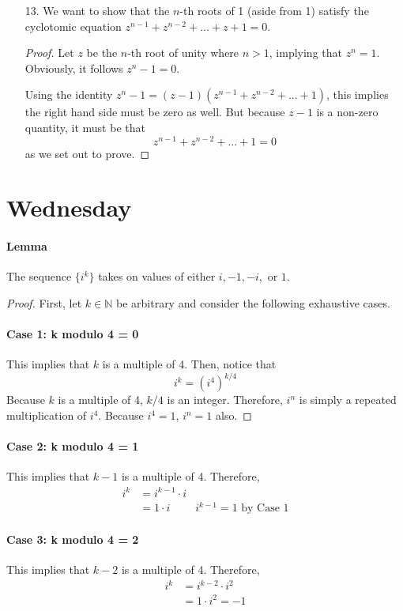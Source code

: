 \documentclass[11pt]{article}
\begin{document}
\begin{enumerate}
	\item[13.] We want to show that the $n$-th roots of 1 (aside from 1) satisfy the cyclotomic equation $z^{n-1} + z^{n-2} + ... + z + 1 = 0$. 
	
	\begin{proof}
		Let $z$ be the $n$-th root of unity where $n > 1$, implying that $z^n = 1$. Obviously, it follows $z^n - 1 = 0$. 
		
		\bigskip
		
		Using the identity $z^n - 1 = (z - 1)(z^{n - 1} + z^{n - 2} + ... + 1)$, this implies the right hand side must be zero as well. But because $z - 1$ is a non-zero quantity, it must be that 
		\[z^{n - 1} + z^{n - 2} + ... + 1 = 0\]
		as we set out to prove.
	\end{proof}
\end{enumerate}

\section*{Wednesday}
\paragraph{Lemma} The sequence $\{i^k\}$ takes on values of either $i, -1, -i, $ or $1$.

\begin{proof}
First, let $k \in \mathbb{N}$ be arbitrary and consider the following exhaustive cases.

\paragraph{Case 1: k modulo 4 = 0} This implies that $k$ is a multiple of 4. Then, notice that 
\[i^k = (i^4)^{k/4}\]
Because $k$ is a multiple of 4, $k/4$ is an integer. Therefore, $i^n$ is simply a repeated multiplication of $i^4$. Because $i^4 = 1$, $i^n = 1$ also.
\end{proof}

\paragraph{Case 2: k modulo 4 = 1} This implies that $k - 1$ is a multiple of 4. Therefore,
\[\begin{aligned}
i^k
&= i^{k-1} \cdot i \\
&= 1 \cdot i & \text{$i^{k-1} = 1$ by Case 1}
\end{aligned}\]

\paragraph{Case 3: k modulo 4 = 2} This implies that $k - 2$ is a multiple of 4. Therefore,
\[\begin{aligned}
i^k
&= i^{k-2} \cdot i^2 \\
&= 1 \cdot i^2 = -1
\end{aligned}\]
\end{document}
